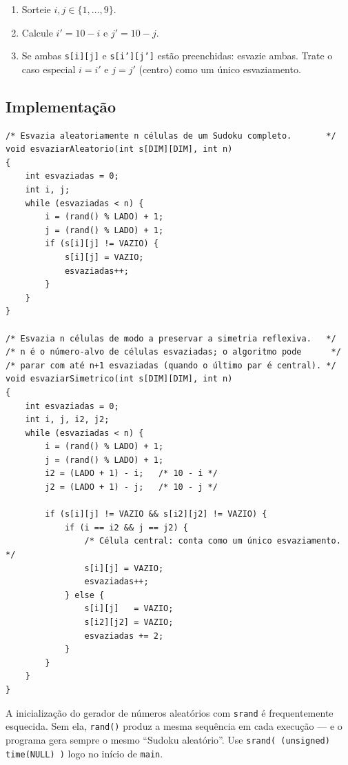 \documentclass[11pt,a4paper,oneside]{report}
\newcommand{\codigo}[1]{\texttt{\color{deitelblue}#1}}
\begin{document}
\begin{enumerate}
    \item Sorteie $i, j \in \{1, \ldots, 9\}$.
    \item Calcule $i' = 10 - i$ e $j' = 10 - j$.
    \item Se ambas \codigo{s[i][j]} e \codigo{s[i'][j']} estão preenchidas:
        esvazie ambas. Trate o caso especial $i = i'$ e $j = j'$ (centro)
        como um único esvaziamento.
\end{enumerate}

\subsection{Implementação}

\begin{lstlisting}[caption={Dois esquemas de esvaziamento de células.},label={lst:gerador_puzzle}]
/* Esvazia aleatoriamente n células de um Sudoku completo.       */
void esvaziarAleatorio(int s[DIM][DIM], int n)
{
    int esvaziadas = 0;
    int i, j;
    while (esvaziadas < n) {
        i = (rand() % LADO) + 1;
        j = (rand() % LADO) + 1;
        if (s[i][j] != VAZIO) {
            s[i][j] = VAZIO;
            esvaziadas++;
        }
    }
}

/* Esvazia n células de modo a preservar a simetria reflexiva.   */
/* n é o número-alvo de células esvaziadas; o algoritmo pode      */
/* parar com até n+1 esvaziadas (quando o último par é central). */
void esvaziarSimetrico(int s[DIM][DIM], int n)
{
    int esvaziadas = 0;
    int i, j, i2, j2;
    while (esvaziadas < n) {
        i = (rand() % LADO) + 1;
        j = (rand() % LADO) + 1;
        i2 = (LADO + 1) - i;   /* 10 - i */
        j2 = (LADO + 1) - j;   /* 10 - j */

        if (s[i][j] != VAZIO && s[i2][j2] != VAZIO) {
            if (i == i2 && j == j2) {
                /* Célula central: conta como um único esvaziamento. */
                s[i][j] = VAZIO;
                esvaziadas++;
            } else {
                s[i][j]   = VAZIO;
                s[i2][j2] = VAZIO;
                esvaziadas += 2;
            }
        }
    }
}
\end{lstlisting}

\begin{erro}
A inicialização do gerador de números aleatórios com \codigo{srand} é
frequentemente esquecida. Sem ela, \codigo{rand()} produz a mesma
sequência em cada execução --- e o programa gera sempre o mesmo
``Sudoku aleatório''. Use \codigo{srand( (unsigned) time(NULL) )} logo
no início de \codigo{main}.
\end{erro}
\end{document}
